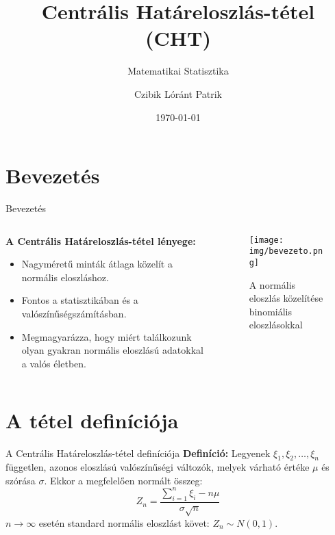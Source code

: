 \documentclass[aspectratio=169,12pt]{beamer}
\title{Centrális Határeloszlás-tétel (CHT)}
\subtitle{Matematikai Statisztika}
\author{Czibik Lóránt Patrik}
\institute{Miskolci Egyetem}
\date{\today}
\begin{document}
	\begin{frame}
		\titlepage
	\end{frame}
	
	\section{Bevezetés}
	\begin{frame}{Bevezetés}
		\begin{columns}
			\begin{column}{0.6\textwidth}
				\textbf{A Centrális Határeloszlás-tétel lényege:}
				\begin{itemize}
					\item Nagyméretű minták átlaga közelít a normális eloszláshoz.
					\item Fontos a statisztikában és a valószínűségszámításban.
					\item Megmagyarázza, hogy miért találkozunk olyan gyakran normális eloszlású adatokkal a valós életben.
				\end{itemize}
			\end{column}
			\begin{column}{0.4\textwidth}
				\begin{figure}
					\texttt{[image: img/bevezeto.png]}
					\caption{A normális eloszlás közelítése binomiális eloszlásokkal}
				\end{figure}
			\end{column}
		\end{columns}
	\end{frame}
	
	\section{A tétel definíciója}
	\begin{frame}{A Centrális Határeloszlás-tétel definíciója}
		\textbf{Definíció:} Legyenek $\xi_1, \xi_2, \ldots, \xi_n$ független, azonos eloszlású valószínűségi változók, melyek várható értéke $\mu$ és szórása $\sigma$. Ekkor a megfelelően normált összeg:
		\begin{equation}
			Z_n = \frac{\sum_{i=1}^{n} \xi_i - n \mu}{\sigma \sqrt{n}}
		\end{equation}
		$n \to \infty$ esetén standard normális eloszlást követ: $Z_n \sim N(0,1)$.
	\end{frame}
	
\end{document}

